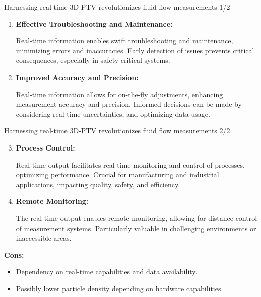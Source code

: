 \begin{frame}[label=why-4a]{Harnessing real-time 3D-PTV revolutionizes fluid flow measurements 1/2}

\begin{card}[Pros: ]
\begin{enumerate}
\item  \textbf{Effective Troubleshooting and Maintenance:}

    Real-time information enables swift troubleshooting and maintenance, minimizing errors and inaccuracies.
    Early detection of issues prevents critical consequences, especially in safety-critical systems.

\item    \textbf{Improved Accuracy and Precision:}

    Real-time information allows for on-the-fly adjustments, enhancing measurement accuracy and precision.
    Informed decisions can be made by considering real-time uncertainties, and optimizing data usage.
\end{enumerate}
\end{card}
\end{frame}

\begin{frame}[label=why-4b]{Harnessing real-time 3D-PTV revolutionizes fluid flow measurements 2/2}

\begin{cardTiny}
\begin{enumerate}
\setcounter{enumi}{2}
\item \textbf{Process Control:}

    Real-time output facilitates real-time monitoring and control of processes, optimizing performance.
    Crucial for manufacturing and industrial applications, impacting quality, safety, and efficiency.

\item   \textbf{Remote Monitoring:}

    The real-time output enables remote monitoring, allowing for distance control of measurement systems.
    Particularly valuable in challenging environments or inaccessible areas.
\end{enumerate}

\textbf{Cons:}

\begin{itemize}
   \item Dependency on real-time capabilities and data availability.
   \item Possibly lower particle density depending on hardware capabilities
\end{itemize}
\end{cardTiny}
\end{frame}


